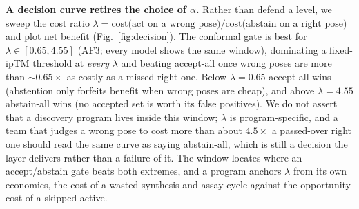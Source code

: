 \documentclass[10pt]{article}
\begin{document}
\textbf{A decision curve retires the choice of $\alpha$.} Rather than defend a level, we sweep the cost
ratio $\lambda=\text{cost(act on a wrong pose)}/\text{cost(abstain on a right pose)}$ and plot net benefit
(Fig.~\ref{fig:decision}). The conformal gate is best for $\lambda\in[0.65,4.55]$ (AF3; every model shows
the same window), dominating a fixed-ipTM threshold at \emph{every} $\lambda$ and beating accept-all once
wrong poses are more than $\sim\!0.65\times$ as costly as a missed right one. Below $\lambda\!=\!0.65$
accept-all wins (abstention only forfeits benefit when wrong poses are cheap), and above $\lambda\!=\!4.55$
abstain-all wins (no accepted set is worth its false positives). We do not assert that a discovery program
lives inside this window; $\lambda$ is program-specific, and a team that judges a wrong pose to cost more
than about $4.5\times$ a passed-over right one should read the same curve as saying abstain-all, which is
still a decision the layer delivers rather than a failure of it. The window locates where an accept/abstain
gate beats both extremes, and a program anchors $\lambda$ from its own economics, the cost of a wasted
synthesis-and-assay cycle against the opportunity cost of a skipped active.
\end{document}
